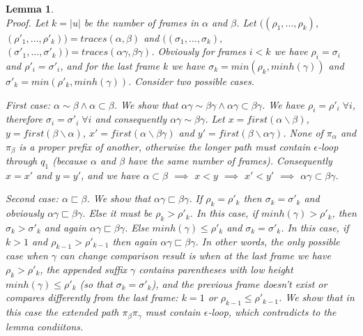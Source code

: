 \documentclass[AMA,STIX1COL]{WileyNJD-v2}
\newtheorem{XLem}{Lemma}
\begin{document}
    \begin{XLem}
    \lemmaclosurerightdist
    \\[0.5em]
    Proof.
    Let $k = |u|$ be the number of frames in $\alpha$ and $\beta$.
    Let
    $\big( (\rho_1, \hdots, \rho_k),$ $(\rho'_1, \hdots, \rho'_k) \big) = traces (\alpha, \beta)$ and
    $\big( (\sigma_1, \hdots, \sigma_k),$ $(\sigma'_1, \hdots, \sigma'_k) \big) = traces (\alpha \gamma, \beta \gamma)$.
    Obviously for frames $i < k$ we have $\rho_i = \sigma_i$ and $\rho'_i = \sigma'_i$,
    and for the last frame $k$ we have
    $\sigma_k = min (\rho_k, minh (\gamma))$ and
    $\sigma'_k = min (\rho'_k, minh (\gamma))$.
    Consider two possible cases.

    First case: $\alpha \sim \beta \wedge \alpha \subset \beta$.
    We show that $\alpha \gamma \sim \beta \gamma \wedge \alpha \gamma \subset \beta \gamma$.
    We have $\rho_i = \rho'_i \; \forall i$, therefore
    $\sigma_i = \sigma'_i \; \forall i$ and consequently $\alpha \gamma \sim \beta \gamma$.
    Let
    $x = first (\alpha \backslash \beta)$,
    $y = first (\beta \backslash \alpha)$,
    $x' = first (\alpha \backslash \beta \gamma)$ and
    $y' = first (\beta \backslash \alpha \gamma)$.
    None of $\pi_\alpha$ and $\pi_\beta$ is a proper prefix of another,
    otherwise the longer path must contain $\epsilon$-loop through $q_1$
    (because $\alpha$ and $\beta$ have the same number of frames).
    Consequently $x = x'$ and $y = y'$, and we have
    $\alpha \subset \beta$
    $\implies$
    $x < y$
    $\implies$
    $x' < y'$
    $\implies$
    $\alpha \gamma \subset \beta \gamma$.

    Second case: $\alpha \sqsubset \beta$.
    We show that $\alpha \gamma \sqsubset \beta \gamma$.
    If $\rho_k = \rho'_k$ then $\sigma_k = \sigma'_k$
    and obviously $\alpha \gamma \sqsubset \beta \gamma$.
    Else it must be $\rho_k > \rho'_k$.
    In this case, if $minh (\gamma) > \rho'_k$, then $\sigma_k > \sigma'_k$ and again $\alpha \gamma \sqsubset \beta \gamma$.
    Else $minh (\gamma) \leq \rho'_k$ and $\sigma_k = \sigma'_k$.
    In this case, if $k > 1$ and $\rho_{k-1} > \rho'_{k-1}$ then again $\alpha \gamma \sqsubset \beta \gamma$.
    In other words, the only possible case when $\gamma$ can change comparison result is
    when at the last frame we have $\rho_k > \rho'_k$,
    the appended suffix $\gamma$ contains parentheses with low height $minh (\gamma) \leq \rho'_k$
    (so that $\sigma_k = \sigma'_k$),
    and the previous frame doesn't exist
    or compares differently from the last frame: $k = 1$ or $\rho_{k-1} \leq \rho'_{k-1}$.
    We show that in this case the extended path $\pi_\beta \pi_\gamma$ must contain $\epsilon$-loop,
    which contradicts to the lemma condiitons.


\end{XLem}
\end{document}
